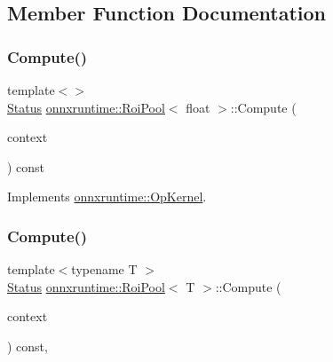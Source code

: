 \subsection{Member Function Documentation}
\mbox{\label{classonnxruntime_1_1RoiPool_af94d63c78ed3f66971133d016d5671e6}} 
\subsubsection{\texorpdfstring{Compute()}{Compute()}\hspace{0.1cm}{\footnotesize\ttfamily [1/2]}}
{\footnotesize\ttfamily template$<$$>$ \\
\mbox{\hyperlink{classonnxruntime_1_1common_1_1Status}{Status}} \mbox{\hyperlink{classonnxruntime_1_1RoiPool}{onnxruntime\+::\+Roi\+Pool}}$<$ float $>$\+::Compute (\begin{DoxyParamCaption}\item[{\mbox{\hyperlink{classonnxruntime_1_1OpKernelContext}{Op\+Kernel\+Context}} $\ast$}]{context }\end{DoxyParamCaption}) const\hspace{0.3cm}{\ttfamily [virtual]}}



Implements \mbox{\hyperlink{classonnxruntime_1_1OpKernel_a9eca8656a78b1b3ab9d3351a12798650}{onnxruntime\+::\+Op\+Kernel}}.

\mbox{\label{classonnxruntime_1_1RoiPool_a740a995505ed3209a2e046a2f9a986d8}} 
\subsubsection{\texorpdfstring{Compute()}{Compute()}\hspace{0.1cm}{\footnotesize\ttfamily [2/2]}}
{\footnotesize\ttfamily template$<$typename T $>$ \\
\mbox{\hyperlink{classonnxruntime_1_1common_1_1Status}{Status}} \mbox{\hyperlink{classonnxruntime_1_1RoiPool}{onnxruntime\+::\+Roi\+Pool}}$<$ T $>$\+::Compute (\begin{DoxyParamCaption}\item[{\mbox{\hyperlink{classonnxruntime_1_1OpKernelContext}{Op\+Kernel\+Context}} $\ast$}]{context }\end{DoxyParamCaption}) const\hspace{0.3cm}{\ttfamily [override]}, {\ttfamily [virtual]}}



